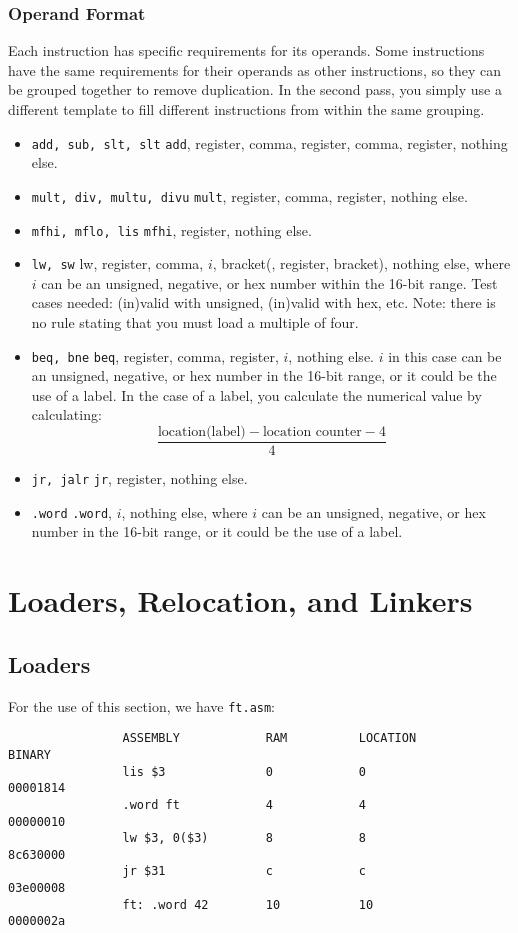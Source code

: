 \documentclass[]{article}
\theoremstyle{definition}
\newcommand{\lecture}[1]{\marginpar{{\footnotesize $\leftarrow$ \underline{#1}}}}
\begin{document}
			\subsubsection{Operand Format}
				Each instruction has specific requirements for its operands. Some instructions have the same requirements for their operands as other instructions, so they can be grouped together to remove duplication. In the second pass, you simply use a different template to fill different instructions from within the same grouping.
				\begin{itemize}
					\item \verb+add, sub, slt, slt+ \textendash{} \verb+add+, register, comma, register, comma, register, nothing else.
					\item \verb+mult, div, multu, divu+ \textendash{} \verb+mult+, register, comma, register, nothing else.
					\item \verb+mfhi, mflo, lis+ \textendash{} \verb+mfhi+, register, nothing else.
					\item \verb+lw, sw+ \textendash{} lw, register, comma, $i$, bracket(, register, bracket), nothing else, where $i$ can be an unsigned, negative, or hex number within the 16-bit range. Test cases needed: (in)valid with unsigned, (in)valid with hex, etc. Note: there is no rule stating that you must load a multiple of four.
					\item  \verb+beq, bne+ \textendash{} \verb+beq+, register, comma, register, $i$, nothing else. $i$ in this case can be an unsigned, negative, or hex number in the 16-bit range, or it could be the use of a label. In the case of a label, you calculate the numerical value by calculating: $$\frac{\text{location(label)} - \text{location counter} - 4}{4}$$
					\item \verb+jr, jalr+ \textendash{} \verb+jr+, register, nothing else.
					\item \verb+.word+ \textendash{} \verb+.word+, $i$, nothing else, where $i$ can be an unsigned, negative, or hex number in the 16-bit range, or it could be the use of a label. 
				\end{itemize}
	\section{Loaders, Relocation, and Linkers} \lecture{January 28, 2013}
		\subsection{Loaders}
			For the use of this section, we have \verb+ft.asm+:
			\begin{verbatim}
				ASSEMBLY            RAM          LOCATION          BINARY
				lis $3              0            0                 00001814
				.word ft            4            4                 00000010
				lw $3, 0($3)        8            8                 8c630000
				jr $31              c            c                 03e00008
				ft: .word 42        10           10                0000002a
			\end{verbatim}
\end{document}
